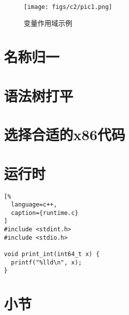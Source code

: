 \begin{figure}[ht]
\centering
\texttt{[image: figs/c2/pic1.png]}
\caption{变量作用域示例}
\label{fig:fig2_1}
\end{figure}


\section{名称归一}

\section{语法树打平}

\section{选择合适的x86代码}

\section{运行时}

\begin{lstlisting}[%
  language=c++,
  caption={runtime.c}
]
#include <stdint.h>
#include <stdio.h>

void print_int(int64_t x) {
  printf("%lld\n", x);
}
\end{lstlisting}

\section{小节}